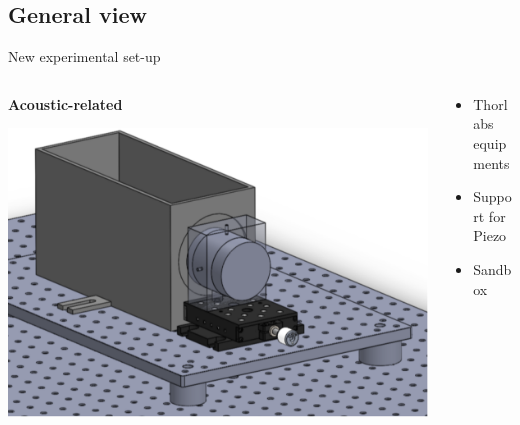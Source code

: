 \documentclass[utf8]{beamer} \usetheme{lfcr} %
\begin{document}
\subsection{General view}
\begin{frame}{New experimental set-up}
  \begin{columns}
    \begin{column}{0.5\textwidth}
      \textbf{Acoustic-related}

      \includegraphics[width=\textwidth]{newsetup.pdf}
    \end{column}
    \begin{column}{0.5\textwidth}
      \begin{itemize}
        \item Thorlabs equipments
        \item Support for Piezo
        \item Sandbox
      \end{itemize}

    \end{column}
  \end{columns}
\end{frame}
%
\end{document}
